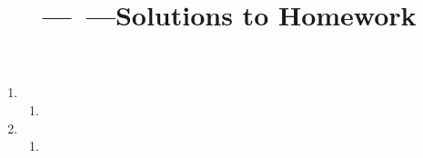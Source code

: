 \documentclass[11pt]{article}
\title{\CourseName---\CourseSemester\ \CourseYear---Solutions to Homework \HWnum}
\author{\Name}
\begin{document}
\maketitle

\begin{enumerate}

\item
\begin{enumerate}
\item
\end{enumerate}

\item
\begin{enumerate}
\item
\end{enumerate}

\end{enumerate}
\end{document}
